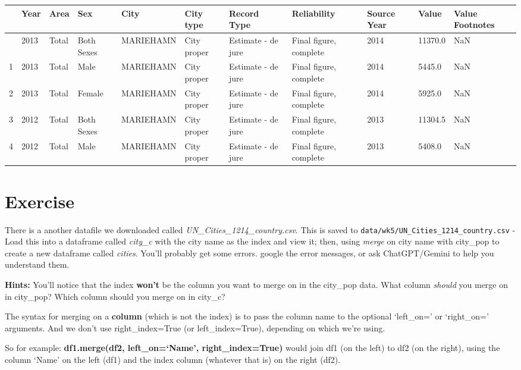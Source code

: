 \documentclass[
  letterpaper,
  DIV=11,
  numbers=noendperiod]{scrreprt}
\begin{document}
\begin{longtable}[]{@{}lllllllllll@{}}
\toprule\noalign{}
& Year & Area & Sex & City & City type & Record Type & Reliability &
Source Year & Value & Value Footnotes \\
\midrule\noalign{}
\endhead
\bottomrule\noalign{}
\endlastfoot
0 & 2013 & Total & Both Sexes & MARIEHAMN & City proper & Estimate - de
jure & Final figure, complete & 2014 & 11370.0 & NaN \\
1 & 2013 & Total & Male & MARIEHAMN & City proper & Estimate - de jure &
Final figure, complete & 2014 & 5445.0 & NaN \\
2 & 2013 & Total & Female & MARIEHAMN & City proper & Estimate - de jure
& Final figure, complete & 2014 & 5925.0 & NaN \\
3 & 2012 & Total & Both Sexes & MARIEHAMN & City proper & Estimate - de
jure & Final figure, complete & 2013 & 11304.5 & NaN \\
4 & 2012 & Total & Male & MARIEHAMN & City proper & Estimate - de jure &
Final figure, complete & 2013 & 5408.0 & NaN \\
\end{longtable}

\hypertarget{exercise-19}{%
\section{Exercise}\label{exercise-19}}

There is a another datafile we downloaded called
\emph{UN\_Cities\_1214\_country.csv}. This is saved to
\texttt{data/wk5/UN\_Cities\_1214\_country.csv} - Load this into a
dataframe called \emph{city\_c} with the city name as the index and view
it; then, using \emph{merge} on city name with city\_pop to create a new
dataframe called \emph{cities}. You'll probably get some errors. google
the error messages, or ask ChatGPT/Gemini to help you understand them.

\textbf{Hints:} You'll notice that the index \textbf{won't} be the
column you want to merge on in the city\_pop data. What column
\emph{should} you merge on in city\_pop? Which column should you merge
on in city\_c?

The syntax for merging on a \textbf{column} (which is not the index) is
to pass the column name to the optional `left\_on=' or `right\_on='
arguments. And we don't use right\_index=True (or left\_index=True),
depending on which we're using.

So for example: \textbf{df1.merge(df2, left\_on=`Name',
right\_index=True)} would join df1 (on the left) to df2 (on the right),
using the column `Name' on the left (df1) and the index column (whatever
that is) on the right (df2).
\end{document}

